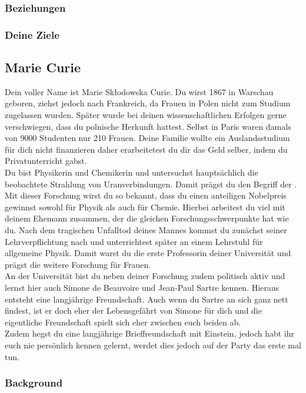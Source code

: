 \documentclass[12pt, a4paper, openany]{report}
\begin{document}
\subsubsection{Beziehungen}
\subsubsection{Deine Ziele}

\subsection{Marie Curie}
Dein voller Name ist Marie Skłodowska Curie. Du wirst 1867 in Warschau geboren, ziehst jedoch nach Frankreich, da Frauen in Polen nicht zum Studium zugelassen wurden. Später wurde bei deinen wissenschaftlichen Erfolgen gerne verschwiegen, dass du polnische Herkunft hattest.
Selbst in Paris waren damals von 9000 Studenten nur 210 Frauen. Deine Familie wollte ein Auslandsstudium für dich nicht finanzieren daher erarbeitetest du dir das Geld selber, indem du Privatunterricht gabst.\\
Du bist Physikerin und Chemikerin und untersuchst hauptsächlich die beobachtete Strahlung von Uranverbindungen. Damit prägst du den Begriff der . Mit dieser Forschung wirst du so bekannt, dass du einen anteiligen Nobelpreis gewinnst sowohl für Physik als auch für Chemie. Hierbei arbeitest du viel mit deinem Ehemann zusammen, der die gleichen Forschungsschwerpunkte hat wie du. Nach dem tragischen Unfalltod deines Mannes kommst du zunächst seiner Lehrverpflichtung nach und unterrichtest später an einem Lehrstuhl für allgemeine Physik. Damit warst du die erste Professorin deiner Universität und prägst die weitere Forschung für Frauen. \\

An der Universität bist du neben deiner Forschung zudem politisch aktiv und lernst hier auch Simone de Beauvoire und Jean-Paul Sartre kennen. Hieraus entsteht eine langjährige Freundschaft. Auch wenn du Sartre an sich ganz nett findest, ist er doch eher der Lebensgefährt von Simone für dich und die eigentliche Freundschaft spielt sich eher zwischen euch beiden ab.\\

Zudem hegst du eine langjährige Brieffreundschaft mit Einstein, jedoch habt ihr euch nie persönlich kennen gelernt, werdet dies jedoch auf der Party das erste mal tun. 

\subsubsection{Background}
\end{document}
